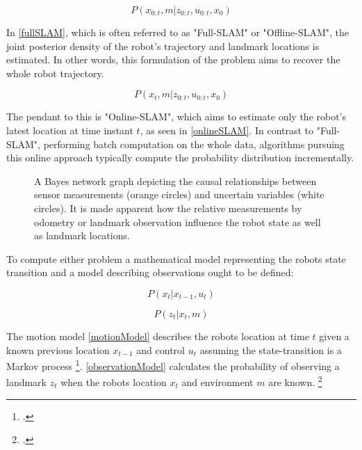 \begin{equation}\label{fullSLAM}
	P(x_{0:t}, m | z_{0:t}, u_{0:t}, x_{0})
\end{equation}

In \ref{fullSLAM}, which is often referred to as "Full-SLAM" or "Offline-SLAM", the joint posterior density of the robot's trajectory and landmark locations is estimated. In other words, this formulation of the problem aims to recover the whole robot trajectory.

\begin{equation}\label{onlineSLAM}
	P(x_{t}, m | z_{0:t}, u_{0:t}, x_{0})
\end{equation}

The pendant to this is "Online-SLAM", which aims to estimate only the robot's latest location at time instant $ t $, as seen in \ref{onlineSLAM}. In contrast to "Full-SLAM", performing batch computation on the whole data, algorithms pursuing this online approach typically compute the probability distribution incrementally. 

\begin{figure}
	\centering
	
	\caption{
		A Bayes network graph depicting the causal relationships between sensor measurements (orange circles) and uncertain variables (white circles). It is made apparent how the relative measurements by odometry or landmark observation influence the robot state as well as landmark locations. 
	}
	\label{fig:slamGraphical}
\end{figure}

To compute either problem a mathematical model representing the robots state transition and a model describing observations ought to be defined:

\begin{equation}\label{motionModel}
	P(x_{t} | x_{t-1}, u_{t})
\end{equation}

\begin{equation}\label{observationModel}
	P(z_{t} | x_{t}, m)
\end{equation}

The motion model \ref{motionModel} describes the robots location at time $ t $ given a known previous location $ x_{t-1} $ and control $ u_{t} $ assuming the state-transition is a Markov process \footcite{haeneltMarvoModel2006}.
\ref{observationModel} calculates the probability of observing a landmark $ z_{t} $ when the robots location $ x_{t} $ and environment $ m $ are known.
\footcite{durrantSlam2006}

